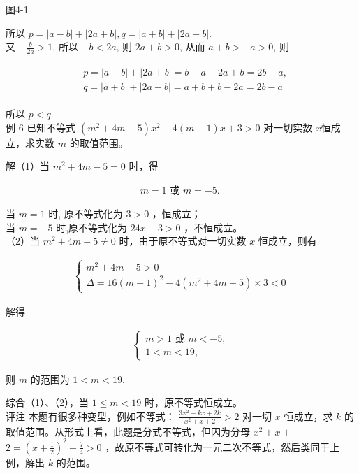 \documentclass[10pt]{article}
\begin{document}
图4-1

所以 $p=|a-b|+|2 a+b|, q=|a+b|+|2 a-b|$.\\
又 $-\frac{b}{2 a}>1$, 所以 $-b<2 a$, 则 $2 a+b>0$, 从而 $a+b>-a>0$, 则

\begin{align*}
\begin{aligned}
& p=|a-b|+|2 a+b|=b-a+2 a+b=2 b+a, \\
& q=|a+b|+|2 a-b|=a+b+b-2 a=2 b-a
\end{aligned}
\end{align*}

所以 $p<q$.\\
例 6 已知不等式 $\left(m^{2}+4 m-5\right) x^{2}-4(m-1) x+3>0$ 对一切实数 $x$恒成立，求实数 $m$ 的取值范围。

解（1）当 $m^{2}+4 m-5=0$ 时，得

\begin{align*}
m=1 \text { 或 } m=-5 \text {. }
\end{align*}

当 $m=1$ 时, 原不等式化为 $3>0$ ，恒成立；\\
当 $m=-5$ 时,原不等式化为 $24 x+3>0$ ，不恒成立。\\
（2）当 $m^{2}+4 m-5 \neq 0$ 时，由于原不等式对一切实数 $x$ 恒成立，则有

\begin{align*}
\left\{\begin{array}{l}
m^{2}+4 m-5>0 \\
\Delta=16(m-1)^{2}-4\left(m^{2}+4 m-5\right) \times 3<0
\end{array}\right.
\end{align*}

解得

\begin{align*}
\left\{\begin{array}{l}
m>1 \text { 或 } m<-5, \\
1<m<19,
\end{array}\right.
\end{align*}

则 $m$ 的范围为 $1<m<19$.

综合（1）、（2），当 $1 \leqslant m<19$ 时，原不等式恒成立。\\
评注 本题有很多种变型，例如不等式： $\frac{3 x^{2}+k x+2 k}{x^{2}+x+2}>2$ 对一切 $x$ 恒成立，求 $k$ 的取值范围。从形式上看，此题是分式不等式，但因为分母 $x^{2}+x+$ $2=\left(x+\frac{1}{2}\right)^{2}+\frac{7}{4}>0$ ，故原不等式可转化为一元二次不等式，然后类同于上例，解出 $k$ 的范围。
\end{document}
